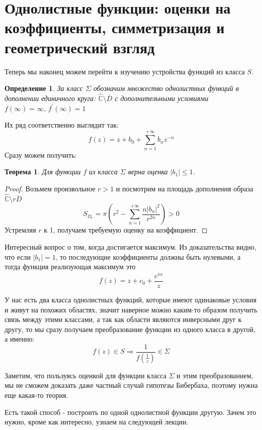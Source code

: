 \documentclass[12pt,a4paper]{article} %
\newtheorem{theorem}{Теорема}
\newtheorem{definition}{Определение}
\newcommand{\Co}{\mathbb{C}}
\begin{document}
	\section{Однолистные функции: оценки на коэффициенты, симметризация и геометрический взгляд}
	Теперь мы наконец можем перейти к изучению устройства функций из класса $S$.
	\begin{definition}
		За класс $\Sigma$ обозначим множество однолистных функций в дополнении единичного круга: $\widehat{\Co}\setminus\overline{D}$ с дополнительными условиями $f(\infty)=\infty,\,f^{'}(\infty)=1$
	\end{definition}
	Их ряд соответственно выглядит так:
	$$f(z)=z+b_0+\sum_{n=1}^{+\infty}b_nz^{-n}$$
	Сразу можем получить:
	\begin{theorem}
		Для функции $f$ из класса $\Sigma$ верна оценка $|b_1|\leq 1$.
	\end{theorem}
	\begin{proof}
		Возьмем произвольное $r>1$ и посмотрим на площадь дополнения образа $\widehat{\Co}\setminus\overline{rD}$
		$$S_{\Omega_r}=\pi\left(r^2-\sum_{n=1}^{+\infty}\frac{n|b_n|^2}{r^{2n}}\right)>0$$
		Устремляя $r$ к 1, получаем требуемую оценку на коэффициент.
	\end{proof}
	Интересный вопрос о том, когда достигается максимум. Из доказательства видно, что если $|b_1|=1$, то последующие коэффициенты должны быть нулевыми, а тогда функция реализующая максимум это
	$$f(z)=z+c_0+\frac{e^{i\alpha}}{z}$$
	
	У нас есть два класса однолистных функций, которые имеют одинаковые условия и живут на похожих областях, значит наверное можно каким-то образом получить связь между этими классами, а так как области являются инверсными друг к другу, то мы сразу получаем преобразование функции из одного класса в другой, а именно:
	$$f(z)\in S\Rightarrow \frac{1}{f(\frac{1}{z})}\in\Sigma$$
	
	Заметим, что пользуясь оценкой для функции класса $\Sigma$ и этим преобразованием, мы не сможем доказать даже частный случай гипотезы Бибербаха, поэтому нужна еще какая-то теория.
	
	Есть такой способ - построить по одной однолистной функции другую. Зачем это нужно, кроме как интересно, узнаем на следующей лекции.
	
\end{document}
